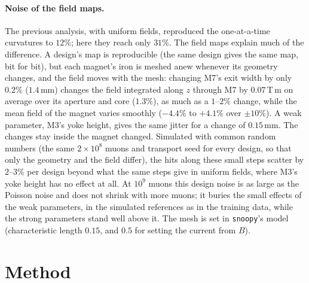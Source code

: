 \documentclass[11pt,a4paper]{article}
\begin{document}
\paragraph{Noise of the field maps.}
The previous analysis, with uniform fields, reproduced the one-at-a-time curvatures to $12\%$;
here they reach only $31\%$. The field maps explain much of the difference. A
design's map is reproducible (the same design gives the same map, bit for bit), but each
magnet's iron is meshed anew whenever its geometry changes, and the field moves with the mesh:
changing M7's exit width by only $0.2\%$ ($1.4$\,mm) changes the field integrated along $z$
through M7 by $0.07$\,T\,m on average over its aperture and core ($1.3\%$), as much as a $1$--$2\%$
change, while the mean field of the magnet varies smoothly ($-4.4\%$ to $+4.1\%$ over
$\pm10\%$). A weak parameter, M3's yoke height, gives the same jitter for a change of $0.15$\,mm.
The changes stay inside the magnet changed. Simulated with common random numbers (the same
$2\times10^8$ muons and transport seed for every design, so that only the geometry and the field
differ), the hits along these small steps scatter by $2$--$3\%$ per design beyond what the same
steps give in uniform fields, where M3's yoke height has no effect at all. At $10^9$ muons this
design noise is as large as the Poisson noise and does not shrink with more muons; it buries the
small effects of the weak parameters, in the simulated references as in the training data,
while the strong parameters stand well above it. The mesh is set in \texttt{snoopy}'s model
(characteristic length $0.15$, and $0.5$ for setting the current from $B$).

\section{Method}
\label{sec:method}
\end{document}
